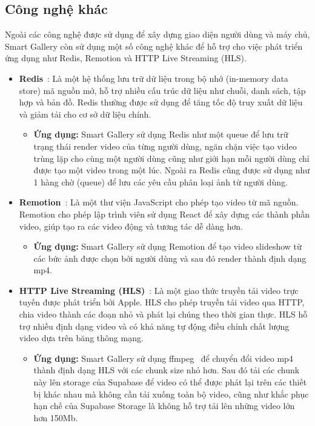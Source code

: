 \subsection{Công nghệ khác}

Ngoài các công nghệ được sử dụng để xây dựng giao diện người dùng và máy chủ, Smart Gallery còn sử dụng một số công nghệ khác để hỗ trợ cho việc phát triển ứng dụng như Redis, Remotion và HTTP Live Streaming (HLS).
\begin{itemize}
    \item \textbf{Redis}~\cite{redisdoc}: Là một hệ thống lưu trữ dữ liệu trong bộ nhớ (in-memory data store) mã nguồn mở, hỗ trợ nhiều cấu trúc dữ liệu như chuỗi, danh sách, tập hợp và bản đồ. Redis thường được sử dụng để tăng tốc độ truy xuất dữ liệu và giảm tải cho cơ sở dữ liệu chính.
    \begin{itemize}
        \item \textbf{Ứng dụng:} Smart Gallery sử dụng Redis như một queue để lưu trữ trạng thái render video của từng người dùng, ngăn chặn việc tạo video trùng lặp cho cùng một người dùng cũng như giới hạn mỗi người dùng chỉ được tạo một video trong một lúc. Ngoài ra Redis cũng được sử dụng như 1 hàng chờ (queue) để lưu các yêu cầu phân loại ảnh từ người dùng. 
    \end{itemize}
    
    \item \textbf{Remotion}~\cite{remotion}: Là một thư viện JavaScript cho phép tạo video từ mã nguồn. Remotion cho phép lập trình viên sử dụng React để xây dựng các thành phần video, giúp tạo ra các video động và tương tác dễ dàng hơn.
    \begin{itemize}
        \item \textbf{Ứng dụng:} Smart Gallery sử dụng Remotion để tạo video slideshow từ các bức ảnh được chọn bởi người dùng và sau đó render thành định dạng mp4.
    \end{itemize}
    
    \item \textbf{HTTP Live Streaming (HLS)}~\cite{hls}: Là một giao thức truyền tải video trực tuyến được phát triển bởi Apple. HLS cho phép truyền tải video qua HTTP, chia video thành các đoạn nhỏ và phát lại chúng theo thời gian thực. HLS hỗ trợ nhiều định dạng video và có khả năng tự động điều chỉnh chất lượng video dựa trên băng thông mạng.
    \begin{itemize}
        \item \textbf{Ứng dụng:} Smart Gallery sử dụng ffmpeg~\cite{ffmpeg} để chuyển đổi video mp4 thành định dạng HLS với các chunk size nhỏ hơn. Sau đó tải các chunk này lên storage của Supabase để video có thể được phát lại trên các thiết bị khác nhau mà không cần tải xuống toàn bộ video, cũng như khắc phục hạn chế của Supabase Storage là không hỗ trợ tải lên những video lớn hơn 150Mb.
    \end{itemize}
\end{itemize}